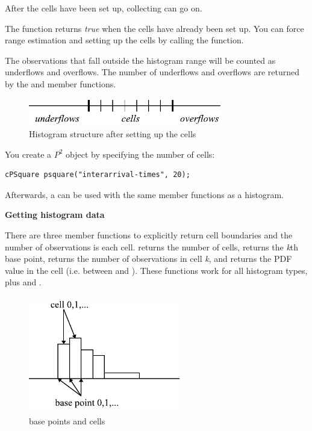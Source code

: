 After the cells have been set up, collecting can go on.

The  function returns \textit{true} when the cells have
already been set up. You can force range estimation and setting
up the cells by calling the  function.

The observations that fall outside the histogram range will be counted
as underflows and overflows. The number of underflows and overflows
are returned by the  and 
member functions.

\begin{figure}[htbp]
\begin{center}
  \includegraphics[width=3.310in, height=0.467in]{figures/usmanFig13}
  \caption{Histogram structure after setting up the cells}
\end{center}
\end{figure}

You create a $P^{2}$ object by specifying the number of cells:

\begin{verbatim}
cPSquare psquare("interarrival-times", 20);
\end{verbatim}

Afterwards, a  can be used with the same member functions
as a histogram.


\textbf{Getting histogram data}


There are three member functions to explicitly return cell boundaries
and the number of observations is each cell.  returns
the number of cells,  returns the
\textit{k}th base point,  returns the
number of observations in cell \textit{k}, and
 returns the PDF value in the cell
(i.e. between  and
).  These functions work for all
histogram types, plus  and .

\begin{figure}[htbp]
  \begin{center}
    \includegraphics[width=2.615in, height=2.001in]{figures/usmanFig14}
    \caption{base points and cells}
  \end{center}
\end{figure}

